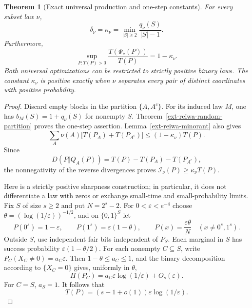 \documentclass[11pt,a4paper]{article}
\newtheorem{theorem}{Theorem}[section]
\theoremstyle{definition}\newtheorem{definition}[theorem]{Definition}
\theoremstyle{remark}\newtheorem{remark}[theorem]{Remark}
\numberwithin{equation}{section}
\begin{document}
\begin{theorem}[Exact universal production and one-step constants]
\label{ext-reiwa-production-exact}
For every subset law $\nu$,
\begin{equation}\label{ext-reiwa-delta-exact}
 \boxed{\displaystyle
 \delta_\nu=\kappa_\nu
 =\min_{|S|\geq2}\frac{q_\nu(S)}{|S|-1}.}
\end{equation}
Furthermore,
\[
 \sup_{P:T(P)>0}\frac{T(\Psi_\nu(P))}{T(P)}=1-\kappa_\nu.
\]
Both universal optimizations can be restricted to strictly positive
binary laws.  The constant $\kappa_\nu$ is positive exactly when $\nu$
separates every pair of distinct coordinates with positive probability.
\end{theorem}
\begin{proof}
Discard empty blocks in the partition $\{A,A^c\}$.  For its induced law
$M$, one has $b_M(S)=1+q_\nu(S)$ for nonempty $S$.
Theorem~\ref{ext-reiwa-random-partition} proves the one-step assertion.
Lemma~\ref{ext-reiwa-minorant} also gives
\[
 \sum_A\nu(A)\bigl[T(P_A)+T(P_{A^c})\bigr]
       \leq(1-\kappa_\nu)T(P).
\]
Since
\[
 D(P\Vert Q_A(P))
 =T(P)-T(P_A)-T(P_{A^c}),
\]
the nonnegativity of the reverse divergences proves
$\mathcal I_\nu(P)\geq\kappa_\nu T(P)$.

Here is a strictly positive sharpness construction; in particular, it
does not differentiate a law with zeros or exchange small-time and
small-probability limits.  Fix $S$ of size $s\geq2$ and put
$N=2^s-2$.  For $0<\varepsilon<e^{-4}$ choose
$\theta=(\log(1/\varepsilon))^{-1/2}$, and on $\{0,1\}^S$ let
\begin{equation}\label{ext-reiwa-positive-witness}
 P(0^s)=1-\varepsilon,\qquad
 P(1^s)=\varepsilon(1-\theta),\qquad
 P(x)=\frac{\varepsilon\theta}{N}\quad(x\ne0^s,1^s).
\end{equation}
Outside $S$, use independent fair bits independent of $P_S$.
Each marginal in $S$ has success probability
$\varepsilon(1-\theta/2)$.  For each nonempty $C\subseteq S$, write
$P_C(X_C\ne0)=a_C\varepsilon$.  Then
$1-\theta\leq a_C\leq1$, and the binary decomposition according to
$\{X_C=0\}$ gives, uniformly in $\theta$,
\[
 H(P_C)=a_C\varepsilon\log(1/\varepsilon)+O_s(\varepsilon).
\]
For $C=S$, $a_S=1$.  It follows that
\begin{equation}\label{ext-reiwa-witness-T}
 T(P)=(s-1+o(1))\varepsilon\log(1/\varepsilon).
\end{equation}


\end{proof}
\end{document}
